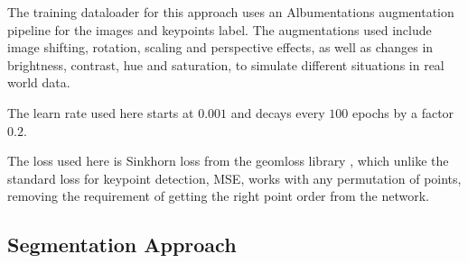 \documentclass[10pt]{book}
\begin{document}
The training dataloader for this approach uses an Albumentations augmentation pipeline for the images and keypoints label. The augmentations used include image shifting, rotation, scaling and perspective effects, as well as changes in brightness, contrast, hue and saturation, to simulate different situations in real world data.

The learn rate used here starts at $0.001$ and decays every $100$ epochs by a factor $0.2$. 


The loss used here is Sinkhorn loss from the geomloss library \cite{feydy2019interpolating}, which unlike the standard loss for keypoint detection, \ac{MSE}, works with any permutation of points, removing the requirement of getting the right point order from the network. 

\subsection{Segmentation Approach}
\end{document}
